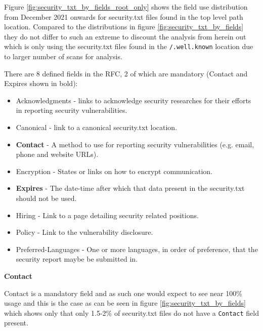 \documentclass{mscreport}
\begin{document}
\vspace{0.3cm} \noindent
Figure \ref{fig:security_txt_by_fields_root_only} shows the field use distribution from December 2021 onwards for security.txt files found in the top level path location. Compared to the distributions in figure \ref{fig:security_txt_by_fields} they do not differ to such an extreme to discount the analysis from herein out which is only using the security.txt files found in the \texttt{/.well.known} location due to larger number of scans for analysis.

\vspace{0.3cm} \noindent
There are 8 defined fields in the RFC, 2 of which are mandatory (Contact and Expires shown in bold):

\begin{itemize}
	\setlength\itemsep{0.1em}
    \item Acknowledgments - links to acknowledge security researches for their efforts in reporting security vulnerabilities.
    \item Canonical - link to a canonical security.txt location.
    \item \textbf{Contact} - A method to use for reporting security vulnerabilities (e.g. email, phone and website URLs).
    \item Encryption - States or links on how to encrypt communication.
    \item \textbf{Expires} - The date-time after which that data present in the security.txt should not be used.
    \item Hiring - Link to a page detailing security related positions.
    \item Policy - Link to the vulnerability disclosure.
    \item Preferred-Languages - One or more languages, in order of preference, that the security report maybe be submitted in.
\end{itemize}

\vspace{0.7cm} \noindent
\textbf{Contact}

\noindent
Contact is a mandatory field and as such one would expect to see near 100\% usage and this is the case as can be seen in figure \ref{fig:security_txt_by_fields} which shows only that only 1.5-2\% of security.txt files do not have a \texttt{Contact} field present.
\end{document}
